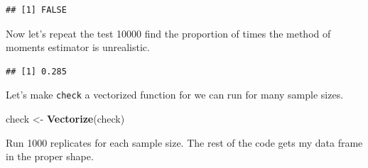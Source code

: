 \documentclass[
]{book}
\newenvironment{Shaded}{\begin{snugshade}}{\end{snugshade}}
\newcommand{\DataTypeTok}[1]{\textcolor[rgb]{0.13,0.29,0.53}{#1}}
\newcommand{\DecValTok}[1]{\textcolor[rgb]{0.00,0.00,0.81}{#1}}
\newcommand{\KeywordTok}[1]{\textcolor[rgb]{0.13,0.29,0.53}{\textbf{#1}}}
\newcommand{\NormalTok}[1]{#1}
\newcommand{\OperatorTok}[1]{\textcolor[rgb]{0.81,0.36,0.00}{\textbf{#1}}}
\newcommand{\StringTok}[1]{\textcolor[rgb]{0.31,0.60,0.02}{#1}}
\begin{document}
\begin{verbatim}
## [1] FALSE
\end{verbatim}

Now let's repeat the test 10000 find the proportion of times the method of moments estimator is unrealistic.

\begin{Shaded}
\end{Shaded}

\begin{verbatim}
## [1] 0.285
\end{verbatim}

Let's make \texttt{check} a vectorized function for we can run for many sample sizes.

\begin{Shaded}
\begin{Highlighting}[]
\NormalTok{check <-}\StringTok{ }\KeywordTok{Vectorize}\NormalTok{(check)}
\end{Highlighting}
\end{Shaded}

Run 1000 replicates for each sample size. The rest of the code gets my data frame in the proper shape.

\begin{Shaded}
\end{Shaded}
\end{document}
